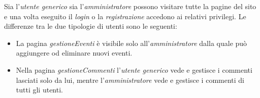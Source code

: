 Sia l'\emph{utente generico} sia l'\emph{amministratore} possono visitare tutte la pagine del sito e una volta eseguito il \emph{login} o la \emph{registrazione} accedono ai relativi privilegi.
Le differenze tra le due tipologie di utenti sono le seguenti:
\begin{itemize}
	\item La pagina \emph{gestioneEventi} è visibile solo all'\emph{amministratore} dalla quale può aggiungere od eliminare nuovi eventi.
	\item Nella pagina \emph{gestioneCommenti} l'\emph{utente generico} vede e gestisce i commenti lasciati solo da lui, mentre l'\emph{amministratore} vede e gestisce i commenti di tutti gli utenti.
\end{itemize}
